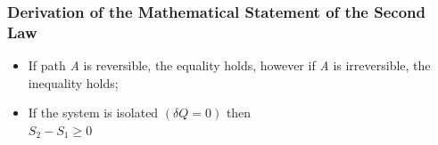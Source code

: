 \documentclass[10pt,compress,handout,ignorenonframetext]{beamer}
\begin{document}
\begin{frame}
 \frametitle{Derivation of the Mathematical Statement of the Second Law}
   \begin{itemize}
  \item <1-> If path {\it A} is reversible, the equality holds, however if {\it A} is irreversible, the inequality holds;
  \item <2-> If the system is isolated $\left(\delta Q = 0\right)$ then\\
    $S_{2}-S_{1}\geq 0$
   \end{itemize}
 \normalsize
    
\end{frame}
\end{document}
